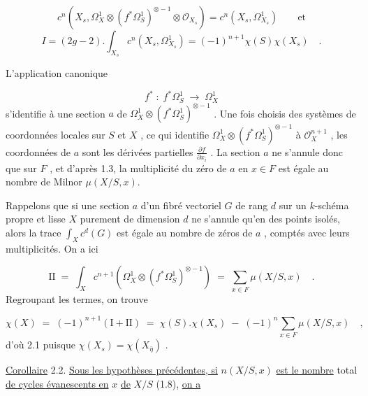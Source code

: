 \begin{equation*}
c^{n}(X_{s},\Omega^{1}_{X} \otimes (f^{*} \Omega^{1}_{S})^{\otimes -1} \otimes \mathcal{O}_{X_{s}}) = c^{n}(X_{s},\Omega^{1}_{X_{s}}) \qquad \mathrm{et}
\end{equation*}
\begin{equation*}
I = (2g-2) . \int_{X_{s}} c^{n}(X_{s},\Omega^{1}_{X_{s}}) = (-1)^{n+1} \chi(S) \chi(X_{s}) \quad .
\end{equation*}


L'application canonique

\begin{equation*}
f^* \; : \; f^*\Omega^1_S \; \longrightarrow \; \Omega^1_X
\end{equation*}
s'identifie à une section $a$ de $\Omega^1_X \otimes (f^*\Omega^1_S)^{\otimes -1}$ . Une fois choisis des systèmes de coordonnées locales sur $S$ et $X$ , ce qui identifie $\Omega^1_X \otimes (f^*\Omega^1_S)^{\otimes -1}$ à $\mathcal{O}_X^{n+1}$ , les coordonnées de $a$ sont les dérivées partielles $\frac{\partial f}{\partial x_i}$ . La section $a$ ne s'annule donc que sur $F$ , et d'après 1.3, la multiplicité du zéro de $a$ en $x \in F$ est égale au nombre de Milnor $\mu(X/S,x)$.

Rappelons que si une section $a$ d'un fibré vectoriel $G$ de rang $d$ sur un $k$-schéma propre et lisse $X$ purement de dimension $d$ ne s'annule qu'en des points isolés, alors la trace $\int_X c^d(G)$ est égale au nombre de zéros de $a$ , comptés avec leurs multiplicités. On a ici

\begin{equation*}
\mathrm{II} \; = \; \int_X c^{n+1}(\Omega^1_X \otimes (f^*\Omega^1_S)^{\otimes -1}) \; = \; \sum_{x \in F} \mu(X/S,x) \quad .
\end{equation*}
Regroupant les termes, on trouve

\begin{equation*}
\chi(X) \; = \; (-1)^{n+1}(\mathrm{I} + \mathrm{II}) \; = \; \chi(S).\chi(X_s) \; - \; (-1)^n \sum_{x \in F} \mu(X/S,x) \quad ,
\end{equation*}
d'où 2.1 puisque $\chi(X_s) = \chi(X_{\bar{\eta}})$ .

\underline{Corollaire} 2.2. \quad \underline{Sous les hypothèses précédentes, si} $n(X/S,x)$ \underline{est le nombre} total \underline{de cycles évanescents en} $x$ \underline{de} $X/S$ (1.8), \underline{on a}

